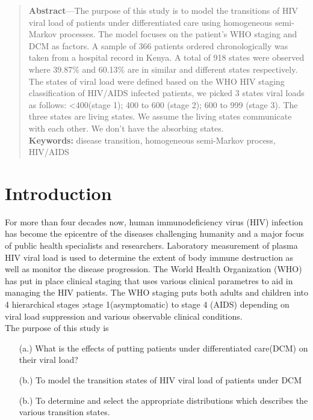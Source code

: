\documentclass[11pt,a4paper]{article}
\begin{document}

  	



\newpage

\begin{abstract}
\noindent\textbf{Abstract}—The purpose of this study is to model the transitions of HIV viral load of patients under differentiated care using homogeneous semi-Markov processes. The model focuses on the patient’s WHO staging and DCM as factors. A sample of 366 patients ordered chronologically  was taken from a hospital record in Kenya.  A total of 918 states were observed where 39.87\% and 60.13\% are in similar and different states respectively. The states of viral load were defined based on the WHO HIV staging classification of HIV/AIDS infected patients, we picked 3 states viral loads as follows: <400(stage 1); 400 to 600 (stage 2); 600 to 999 (stage 3). The three states are living states. We assume the living states communicate with each other. We don’t have the absorbing states.\\

\textbf{Keywords:} disease transition, homogeneous semi-Markov process, HIV/AIDS

\end{abstract}


\section{Introduction}
For more than four decades now, human immunodeficiency virus (HIV) infection has become the epicentre of the diseases challenging humanity and a major focus of public health specialists and researchers. Laboratory measurement of plasma HIV viral load is used to determine the extent of body immune destruction as well as monitor the disease progression. The World Health Organization (WHO) has put in place clinical staging that uses various clinical parametres to aid in managing the HIV patients. The WHO staging puts both adults and children into 4 hierarchical stages ;stage 1(asymptomatic) to stage 4 (AIDS) depending on viral load suppression and various observable clinical conditions.\\

The purpose of this study is
\begin{enumerate}
    \item[(a.)] What is the effects of putting patients under differentiated care(DCM) on their viral load?
    \item[(b.)] To model the transition states of HIV viral load of patients under DCM
    \item[(b.)] To determine and select the appropriate distributions which describes the various transition states.

\end{enumerate}
\end{document}
